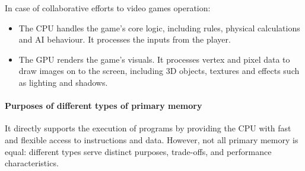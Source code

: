 \documentclass[a4paper,12pt]{article}
\begin{document}
In case of collaborative efforts to video games operation:
\begin{itemize}
	\item The CPU handles the game’s core logic, including rules, physical calculations and AI behaviour. It processes the inputs from the player.
	\item The GPU renders the game’s visuals. It processes vertex and pixel data to draw images on to the screen, including 3D objects, textures and effects such as lighting and shadows. 
\end{itemize}
\paragraph{Purposes of different types of primary memory}
It directly supports the execution of programs by providing the CPU with fast and flexible access to instructions and data. However, not all primary memory is equal: different types serve distinct purposes, trade-offs, and performance characteristics.
\end{document}
